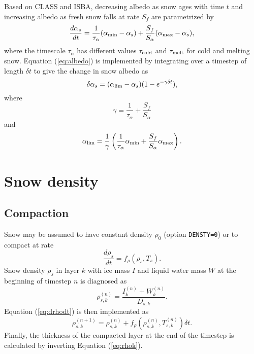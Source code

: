 \documentclass{article}
\begin{document}
Based on CLASS and ISBA, decreasing albedo as snow ages with time $t$ and increasing albedo as fresh snow falls at rate $S_f$ are parametrized by
\begin{equation}
\frac{d\alpha_s}{dt} = \frac{1}{\tau_\alpha}(\alpha_{\rm min} - \alpha_s) + \frac{S_f}{S_\alpha}(\alpha_{\rm max} - \alpha_s),
\label{eq:albedo} 
\end{equation} 
where the timescale $\tau_\alpha$ has different values $\tau_{\rm cold}$ and $\tau_{\rm melt}$ for cold and melting snow. Equation (\ref{eq:albedo}) is implemented by integrating over a timestep of length $\delta t$ to give the change in snow albedo as
\begin{equation}
\delta\alpha_s = (\alpha_{\rm lim} - \alpha_s)(1-e^{-\gamma\delta t}),  
\end{equation}
where
\begin{equation}
\gamma = \frac{1}{\tau_\alpha}+\frac{S_f}{S_\alpha}
\end{equation}
and
\begin{equation}
\alpha_{\rm lim} = \frac{1}{\gamma}\left(\frac{1}{\tau_\alpha}\alpha_{\rm min} +\frac{S_f}{S_\alpha}\alpha_{\rm max}\right).
\end{equation}

\section{Snow density}

\subsection{Compaction}
Snow may be assumed to have constant density $\rho_0$ (option {\tt DENSTY=0}) or to compact at rate
\begin{equation}
\frac{d\rho_s}{dt} = f_\rho(\rho_s,T_s).
\label{eq:drhodt}
\end{equation}
Snow density $\rho_s$ in layer $k$ with ice mass $I$ and liquid water mass $W$ at the beginning of timestep $n$ is diagnosed as
\begin{equation}
\rho_{s,k}^{(n)} = \frac{I_k^{(n)} + W_k^{(n)}}{D_{s,k}}.
\label{eq:rhok}
\end{equation}
Equation (\ref{eq:drhodt}) is then implemented as
\begin{equation}
\rho_{s,k}^{(n+1)} = \rho_{s,k}^{(n)} + f_\rho\left(\rho_{s,k}^{(n)},T_{s,k}^{(n)}\right)\delta t.
\end{equation}
Finally, the thickness of the compacted layer at the end of the timestep is calculated by inverting Equation (\ref{eq:rhok}).
\end{document}
